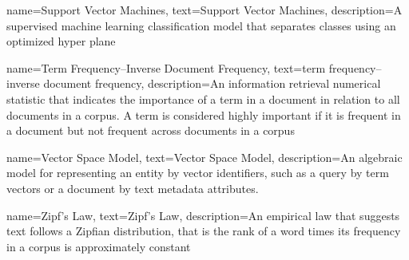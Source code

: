{
    name=Support Vector Machines,
    text=Support Vector Machines,
    description=A supervised machine learning classification model that separates classes using an optimized hyper plane
}

{
    name=Term Frequency–Inverse Document Frequency,
    text=term frequency–inverse document frequency,
    description=An information retrieval numerical statistic that indicates the importance of a term in a document in relation to all documents in a corpus. A term is considered highly important if it is frequent in a document but not frequent across documents in a corpus
}

{
    name=Vector Space Model,
    text=Vector Space Model,
    description={An algebraic model for representing an entity by vector identifiers, such as a query by term vectors or a document by text metadata attributes.}
}

{
    name=Zipf's Law,
    text=Zipf's Law,
    description={An empirical law that suggests text follows a Zipfian distribution, that is the rank of a word times its frequency in a corpus is approximately constant}
}